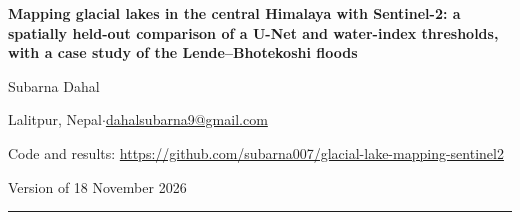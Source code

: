 \documentclass[11pt,a4paper]{article}
\begin{document}
\begin{center}
{\LARGE\bfseries Mapping glacial lakes in the central Himalaya with Sentinel-2: a spatially held-out comparison of a U-Net and water-index thresholds, with a case study of the Lende--Bhotekoshi floods\par}
\vspace{1.0em}
{\large Subarna Dahal\par}
\vspace{0.3em}
{\small Lalitpur, Nepal\quad$\cdot$\quad \href{mailto:dahalsubarna9@gmail.com}{dahalsubarna9@gmail.com}\par}
{\small Code and results: \url{https://github.com/subarna007/glacial-lake-mapping-sentinel2}\par}
\vspace{0.3em}
{\small Version of 18 November 2026\par}
\end{center}
\vspace{0.4em}
\noindent\rule{\textwidth}{0.4pt}
\end{document}
